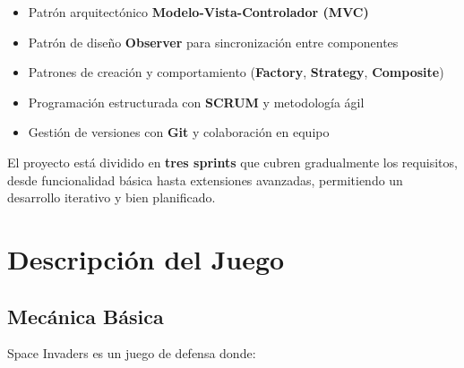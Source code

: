 \documentclass[12pt, a4paper]{article}
\begin{document}
\begin{itemize}[leftmargin=2em]
    \item Patrón arquitectónico \textbf{Modelo-Vista-Controlador (MVC)}
    \item Patrón de diseño \textbf{Observer} para sincronización entre componentes
    \item Patrones de creación y comportamiento (\textbf{Factory}, \textbf{Strategy}, \textbf{Composite})
    \item Programación estructurada con \textbf{SCRUM} y metodología ágil
    \item Gestión de versiones con \textbf{Git} y colaboración en equipo
\end{itemize}

El proyecto está dividido en \textbf{tres sprints} que cubren gradualmente los requisitos, desde funcionalidad básica hasta extensiones avanzadas, permitiendo un desarrollo iterativo y bien planificado.

\section{Descripción del Juego}

\subsection{Mecánica Básica}

Space Invaders es un juego de defensa donde:
\end{document}
